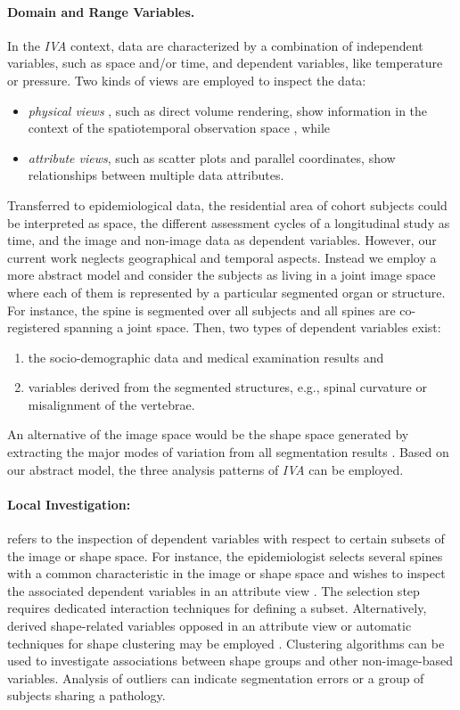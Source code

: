 \documentclass[journal]{style/vgtc} 			          %
\begin{document}
\paragraph{Domain and Range Variables. }
In the \emph{IVA} context, data are characterized by a combination of independent variables, such as space and/or time, and dependent variables, like temperature or pressure.
%
Two kinds of views are employed to inspect the data:
\begin{itemize} 
	\item \emph{physical views} \cite{Oeltze2013}, such as direct volume rendering, show information in the context of the spatiotemporal observation space \cite{Oeltze2007}, while
	\item \emph{attribute views}, such as scatter plots and parallel coordinates, show relationships between multiple data attributes.
\end{itemize}
Transferred to epidemiological data, the residential area of cohort subjects could be interpreted as space, the different assessment cycles of a longitudinal study as time, and the image and non-image data as dependent variables.
%
However, our current work neglects geographical and temporal aspects.
%
Instead we employ a more abstract model and consider the subjects as living in a joint image space where each of them is represented by a particular segmented organ or structure.
%
For instance, the spine is segmented over all subjects and all spines are co-registered spanning a joint space.
%
Then, two types of dependent variables exist: 
\begin{enumerate}
	\item the socio-demographic data and medical examination results and 
	\item variables derived from the segmented structures, e.g., spinal curvature or misalignment of the vertebrae.
\end{enumerate}
An alternative of the image space would be the shape space generated by extracting the major modes of variation from all segmentation results \cite{Busking2010a}.
%
Based on our abstract model, the three analysis patterns of \emph{IVA} can be employed.

\paragraph{Local Investigation:} refers to the inspection of dependent variables with respect to certain subsets of the image or shape space.
%
For instance, the epidemiologist selects several spines with a common characteristic in the image or shape space and wishes to inspect the associated dependent variables in an attribute view \cite{Hermann2014}.
%
The selection step requires dedicated interaction techniques for defining a subset.
%
Alternatively, derived shape-related variables opposed in an attribute view or automatic techniques for shape clustering may be employed \cite{Klemm2013VMV}.
%
Clustering algorithms can be used to investigate associations between shape groups and other non-image-based variables.
%
Analysis of outliers can indicate segmentation errors or a group of subjects sharing a pathology.
\end{document}
